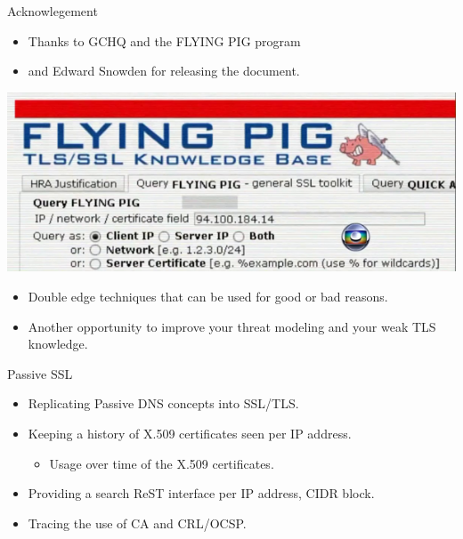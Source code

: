 \begin{frame}[t,fragile]{Acknowlegement}
        \begin{itemize}
                \item Thanks to GCHQ and the FLYING PIG program
                \item and Edward Snowden for releasing the document.
        \end{itemize}

\includegraphics[scale=0.4]{FlyingPigHeader.png}
        \begin{itemize}
                \item Double edge techniques that can be used for good or bad reasons.
                \item Another opportunity to improve your threat modeling and your weak TLS knowledge.
        \end{itemize}
\end{frame}

\begin{frame}[t,fragile]{Passive SSL}
        \begin{itemize}
                \item Replicating Passive DNS concepts into SSL/TLS.
                \item Keeping a history of X.509 certificates seen per IP address.
                \begin{itemize}
                        \item Usage over time of the X.509 certificates.
                \end{itemize}
                \item Providing a search ReST interface per IP address, CIDR block.
                \item Tracing the use of CA and CRL/OCSP.
        \end{itemize}
\end{frame}

